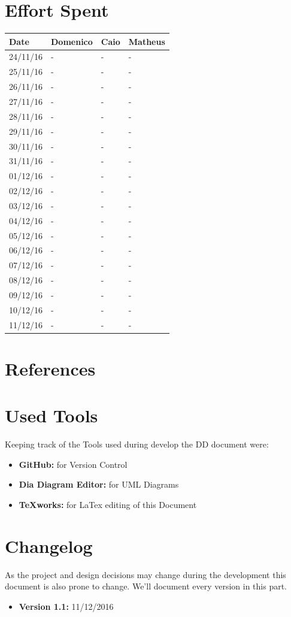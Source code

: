 \documentclass[a4paper]{article}
\begin{document}
\section{Effort Spent}
\begin{tabular}{ | l | l | l | l | }
\hline
	\textbf {Date} & \textbf {Domenico} & \textbf {Caio} & \textbf {Matheus} \\ \hline
	24/11/16& - & - & - \\ \hline
	25/11/16& - & - & - \\ \hline
	26/11/16& - & - & - \\ \hline
	27/11/16& - & - & -  \\ \hline
	28/11/16& - & - & - \\ \hline
	29/11/16& - & - & - \\ \hline
	30/11/16& - & - & - \\ \hline
	31/11/16& - & - & - \\ \hline
	01/12/16& - & - & - \\ \hline
	02/12/16& - & - & - \\ \hline
	03/12/16& - & - & - \\ \hline
	04/12/16& - & - & - \\ \hline
	05/12/16& - & - & - \\ \hline
	06/12/16& - & - & - \\ \hline
	07/12/16& - & - & - \\ \hline
	08/12/16& - & - & - \\ \hline
	09/12/16& - & - & - \\ \hline
	10/12/16& - & - & - \\ \hline
	11/12/16& - & - & - \\ \hline
\end{tabular}
\newpage

\section{References}
\newpage


\section{Used Tools}
Keeping track of the Tools used during develop the DD document were:
\begin{itemize}
	\item \textbf{GitHub:} for Version Control
	\item \textbf {Dia Diagram Editor:} for UML Diagrams
	\item \textbf {TeXworks:} for LaTex editing of this Document
\end{itemize}
\newpage

\section{Changelog}
As the project and design decisions may change during the development this document is also prone to change.
We'll document every version in this part.
\begin{itemize}
\item \textbf {Version 1.1:} 11/12/2016
\end{itemize}
\end{document}
